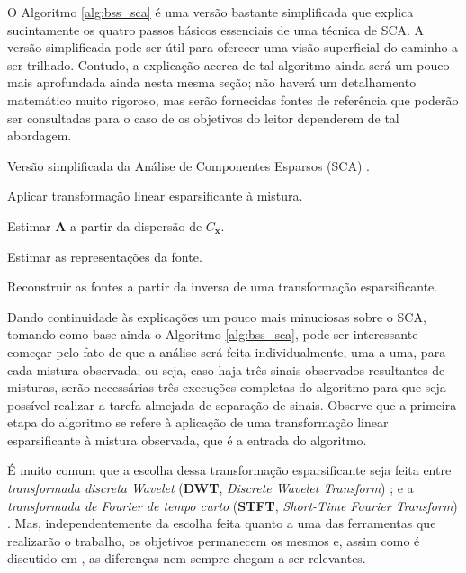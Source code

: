 O Algoritmo \ref{alg:bss_sca} é uma versão bastante simplificada que explica sucintamente os quatro passos básicos essenciais de uma técnica de SCA. A versão simplificada pode ser útil para oferecer uma visão superficial do caminho a ser trilhado. Contudo, a explicação acerca de tal algoritmo ainda será um pouco mais aprofundada ainda nesta mesma seção; não haverá um detalhamento matemático muito rigoroso, mas serão fornecidas fontes de referência que poderão ser consultadas para o caso de os objetivos do leitor dependerem de tal abordagem. \\

\begin{algorithm}[H]
    \caption{Versão simplificada da Análise de Componentes Esparsos (SCA) \citep{gribonval2006survey}.}
    \label{alg:bss_sca}
    \begin{algorithmic}[1]

        \State Aplicar transformação linear esparsificante à mistura.

        \State Estimar $\bm{A}$ a partir da dispersão de $C_{\bm{x}}$.

        \State Estimar as representações da fonte.

        \State Reconstruir as fontes a partir da inversa de uma transformação esparsificante.

    \end{algorithmic}

\end{algorithm}

Dando continuidade às explicações um pouco mais minuciosas sobre o SCA, tomando como base ainda o Algoritmo \ref{alg:bss_sca}, pode ser interessante começar pelo fato de que a análise será feita individualmente, uma a uma, para cada mistura observada; ou seja, caso haja três sinais observados resultantes de misturas, serão necessárias três execuções completas do algoritmo para que seja possível realizar a tarefa almejada de separação de sinais. Observe que a primeira etapa do algoritmo se refere à aplicação de uma transformação linear esparsificante à mistura observada, que é a entrada do algoritmo.

É muito comum que a escolha dessa transformação esparsificante seja feita entre \textit{transformada discreta Wavelet} (\textbf{DWT}, \textit{Discrete Wavelet Transform}) \citep{meyer1995wavelets, chui2016introduction}; e a \textit{transformada de Fourier de tempo curto} (\textbf{STFT}, \textit{Short-Time Fourier Transform}) \citep{1162950}. Mas, independentemente da escolha feita quanto a uma das ferramentas que realizarão o trabalho, os objetivos permanecem os mesmos e, assim como é discutido em \citep{bruns2004fourier}, as diferenças nem sempre chegam a ser relevantes.

